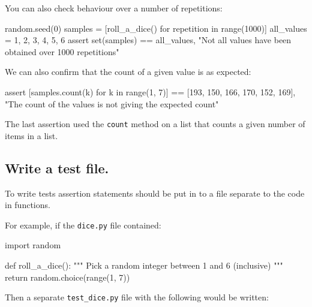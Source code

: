 You can also check behaviour over a number of repetitions:





\begin{pyin}
random.seed(0)
samples = [roll_a_dice() for repetition in range(1000)]
all_values = {1, 2, 3, 4, 5, 6}
assert set(samples) == all_values, "Not all values have been obtained over 1000 repetitions"
\end{pyin}






We can also confirm that the count of a given value is as expected:


\begin{pyin}
assert [samples.count(k) for k in range(1, 7)] == [193, 150, 166, 170, 152, 169], "The count of the values is not giving the expected count"
\end{pyin}


\begin{note}
The last assertion used the \texttt{count} method on a list that counts a given number
of items in a list.
\end{note}



\subsection{Write a test file.}

To write tests assertion statements should be put in to a file separate to the code
in functions.


For example, if the \texttt{dice.py} file contained:

\begin{pyin}
import random


def roll_a_dice():
    """
    Pick a random integer between 1 and 6 (inclusive)
    """
    return random.choice(range(1, 7))
\end{pyin}


Then a separate \texttt{test\_dice.py} file with the following would be written:

